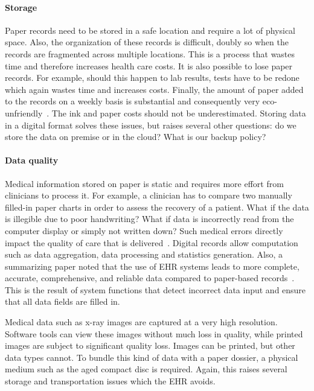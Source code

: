     \paragraph{Storage} Paper records need to be stored in a safe location and require a lot of physical space. Also, the organization of these records is difficult, doubly so when the records are fragmented across multiple locations. This is a process that wastes time and therefore increases health care costs. It is also possible to lose paper records. For example, should this happen to lab results, tests have to be redone which again wastes time and increases costs. Finally, the amount of paper added to the records on a weekly basis is substantial and consequently very eco-unfriendly~\cite{Saleem2009}. The ink and paper costs should not be underestimated. Storing data in a digital format solves these issues, but raises several other questions: do we store the data on premise or in the cloud? What is our backup policy? 

    \paragraph{Data quality} Medical information stored on paper is static and requires more effort from clinicians to process it. For example, a clinician has to compare two manually filled-in paper charts in order to assess the recovery of a patient. What if the data is illegible due to poor handwriting? What if data is incorrectly read from the computer display or simply not written down? Such medical errors directly impact the quality of care that is delivered~\cite{Elnahal2011, Hillestad2005}. Digital records allow computation such as data aggregation, data processing and statistics generation. Also, a summarizing paper noted that the use of EHR systems leads to more complete, accurate, comprehensive, and reliable data compared to paper-based records~\cite{Hayrinen2008}. This is the result of system functions that detect incorrect data input and ensure that all data fields are filled in.

    Medical data such as x-ray images are captured at a very high resolution. Software tools can view these images without much loss in quality, while printed images are subject to significant quality loss. Images can be printed, but other data types cannot. To bundle this kind of data with a paper dossier, a physical medium such as the aged compact disc is required. Again, this raises several storage and transportation issues which the EHR avoids.

